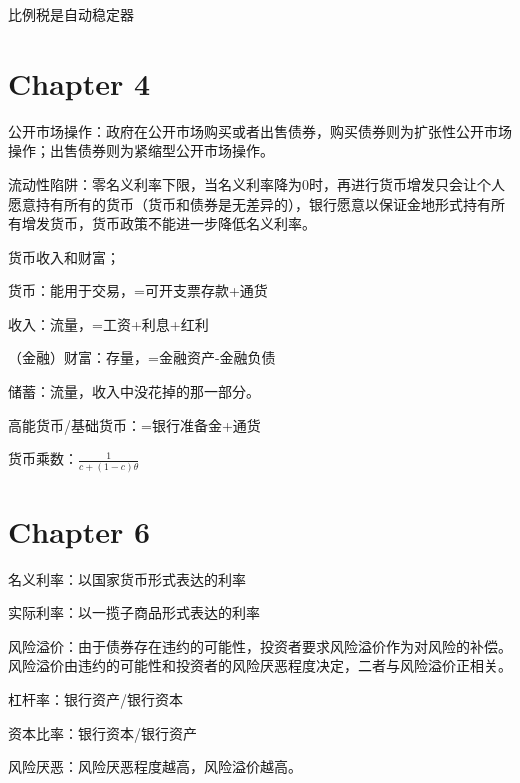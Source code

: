 \documentclass{article}
\begin{document}
比例税是自动稳定器

\section{Chapter 4}

公开市场操作：政府在公开市场购买或者出售债券，购买债券则为扩张性公开市场操作；出售债券则为紧缩型公开市场操作。

\hspace*{\fill}

流动性陷阱：零名义利率下限，当名义利率降为0时，再进行货币增发只会让个人愿意持有所有的货币（货币和债券是无差异的），银行愿意以保证金地形式持有所有增发货币，货币政策不能进一步降低名义利率。

\hspace*{\fill}

货币收入和财富；

货币：能用于交易，=可开支票存款+通货

收入：流量，=工资+利息+红利

（金融）财富：存量，=金融资产-金融负债

储蓄：流量，收入中没花掉的那一部分。

\hspace*{\fill}

高能货币/基础货币：=银行准备金+通货

\hspace*{\fill}

货币乘数：$ \frac{1}{c+(1-c)\theta} $

\section{Chapter 6}

名义利率：以国家货币形式表达的利率

实际利率：以一揽子商品形式表达的利率

\hspace*{\fill}

风险溢价：由于债券存在违约的可能性，投资者要求风险溢价作为对风险的补偿。风险溢价由违约的可能性和投资者的风险厌恶程度决定，二者与风险溢价正相关。

\hspace*{\fill}

杠杆率：银行资产/银行资本

资本比率：银行资本/银行资产

\hspace*{\fill}

风险厌恶：风险厌恶程度越高，风险溢价越高。
\end{document}
